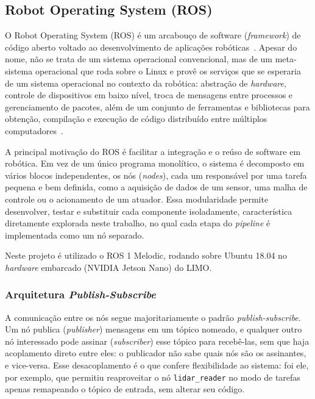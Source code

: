 \subsection{Robot Operating System (ROS)}

O Robot Operating System (ROS) é um arcabouço de software (\textit{framework})
de código aberto voltado ao desenvolvimento de aplicações
robóticas~\cite{quigley2009ros}. Apesar do nome, não se trata de um sistema
operacional convencional, mas de um meta-sistema operacional que roda
sobre o Linux e provê os serviços que se esperaria de um sistema operacional no
contexto da robótica: abstração de \textit{hardware}, controle de dispositivos em
baixo nível, troca de mensagens entre processos e gerenciamento de pacotes, além
de um conjunto de ferramentas e bibliotecas para obtenção, compilação e execução
de código distribuído entre múltiplos computadores~\cite{quigley2015programming}.

A principal motivação do ROS é facilitar a integração e o reúso de software em
robótica. Em vez de um único programa monolítico, o sistema é decomposto em vários
blocos independentes, os nós (\textit{nodes}), cada um responsável por
uma tarefa pequena e bem definida, como a aquisição de dados de um sensor, uma
malha de controle ou o acionamento de um atuador. Essa modularidade permite
desenvolver, testar e substituir cada componente isoladamente, característica
diretamente explorada neste trabalho, no qual cada etapa do \textit{pipeline} é
implementada como um nó separado.

Neste projeto é utilizado o ROS 1 Melodic, rodando sobre Ubuntu 18.04 no
\textit{hardware} embarcado (NVIDIA Jetson Nano) do LIMO.

\subsubsection{Arquitetura \textit{Publish-Subscribe}}

A comunicação entre os nós segue majoritariamente o padrão
\textit{publish-subscribe}. Um nó publica (\textit{publisher}) mensagens
em um tópico nomeado, e qualquer outro nó interessado pode assinar
(\textit{subscriber}) esse tópico para recebê-las, sem que haja acoplamento direto
entre eles: o publicador não sabe quais nós são os assinantes, e vice-versa. Esse
desacoplamento é o que confere flexibilidade ao sistema: foi ele, por exemplo,
que permitiu reaproveitar o nó \texttt{lidar\_reader} no modo de tarefas apenas
remapeando o tópico de entrada, sem alterar seu código.

